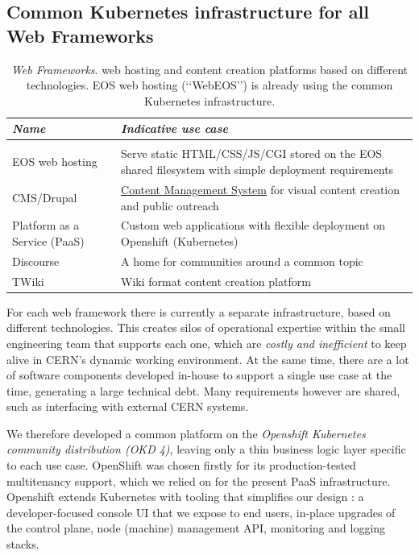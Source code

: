 \subsection{Common Kubernetes infrastructure for all Web Frameworks}
\label{sec-web-frameworks}

\begin{table}[h!]
\begin{tabularx}{\textwidth}{ p{10em}| >{\raggedright\arraybackslash}X}
    \emph{Name} & \emph{Indicative use case} \\
    \hline \\
    EOS web hosting & Serve static HTML/CSS/JS/CGI stored on the EOS shared filesystem with simple deployment requirements \\
    CMS/Drupal & \hyperref[what-is-drupal]{Content Management System} for visual content creation and public outreach \\
    Platform as a Service (PaaS) & Custom web applications with flexible deployment on Openshift (Kubernetes) \\
    Discourse & A home for communities around a common topic \\
    TWiki & Wiki format content creation platform
\end{tabularx}
\caption{\emph{Web Frameworks}. web hosting and content creation platforms based on different technologies.
EOS web hosting (\lq\lq WebEOS\rq\rq) is already using the common Kubernetes infrastructure.}
\vspace{-1.8em}
\label{tab-wf}
\end{table}

For each web framework there is currently a separate infrastructure, based on different technologies.
This creates silos of operational expertise within the small engineering team that supports each one, which are \emph{costly and inefficient} to keep alive in CERN's dynamic working environment.
At the same time, there are a lot of software components developed in-house to support a single use case at the time, generating a large technical debt.
Many requirements however are shared, such as interfacing with external CERN systems.

We therefore developed a common platform on the \emph{Openshift Kubernetes community distribution (OKD 4)},
leaving only a thin business logic layer specific to each use case.
OpenShift was chosen firstly for its production-tested multitenancy support, which we relied on for the present PaaS infrastructure.
Openshift extends Kubernetes with tooling that simplifies our design \cite{jarvinen_extending_2019}:
a developer-focused console UI that we expose to end users, in-place upgrades of the control plane, node (machine) management API, monitoring and logging stacks.

